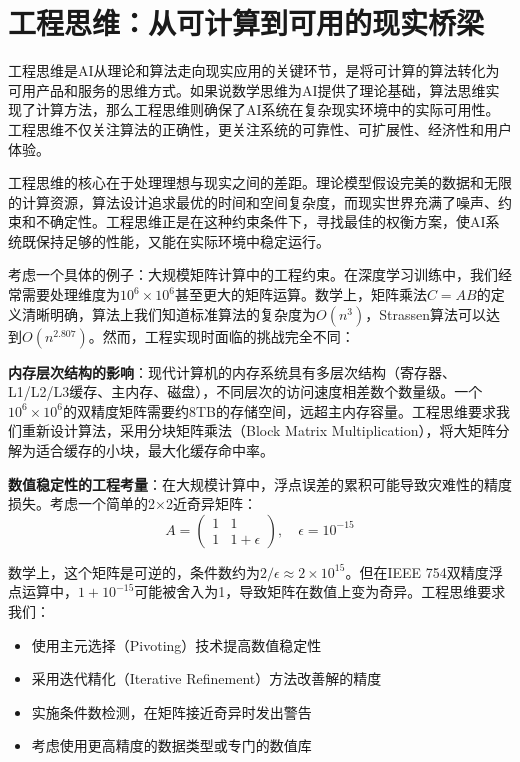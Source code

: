\section{工程思维：从可计算到可用的现实桥梁}

工程思维是AI从理论和算法走向现实应用的关键环节，是将可计算的算法转化为可用产品和服务的思维方式。如果说数学思维为AI提供了理论基础，算法思维实现了计算方法，那么工程思维则确保了AI系统在复杂现实环境中的实际可用性。工程思维不仅关注算法的正确性，更关注系统的可靠性、可扩展性、经济性和用户体验。

工程思维的核心在于处理理想与现实之间的差距。理论模型假设完美的数据和无限的计算资源，算法设计追求最优的时间和空间复杂度，而现实世界充满了噪声、约束和不确定性。工程思维正是在这种约束条件下，寻找最佳的权衡方案，使AI系统既保持足够的性能，又能在实际环境中稳定运行。

考虑一个具体的例子：大规模矩阵计算中的工程约束。在深度学习训练中，我们经常需要处理维度为$10^6 \times 10^6$甚至更大的矩阵运算。数学上，矩阵乘法$C = AB$的定义清晰明确，算法上我们知道标准算法的复杂度为$O(n^3)$，Strassen算法可以达到$O(n^{2.807})$。然而，工程实现时面临的挑战完全不同：

\textbf{内存层次结构的影响}：现代计算机的内存系统具有多层次结构（寄存器、L1/L2/L3缓存、主内存、磁盘），不同层次的访问速度相差数个数量级。一个$10^6 \times 10^6$的双精度矩阵需要约8TB的存储空间，远超主内存容量。工程思维要求我们重新设计算法，采用分块矩阵乘法（Block Matrix Multiplication），将大矩阵分解为适合缓存的小块，最大化缓存命中率。

\textbf{数值稳定性的工程考量}：在大规模计算中，浮点误差的累积可能导致灾难性的精度损失。考虑一个简单的2×2近奇异矩阵：
$$A = \begin{pmatrix} 1 & 1 \\ 1 & 1+\epsilon \end{pmatrix}, \quad \epsilon = 10^{-15}$$

数学上，这个矩阵是可逆的，条件数约为$2/\epsilon \approx 2 \times 10^{15}$。但在IEEE 754双精度浮点运算中，$1 + 10^{-15}$可能被舍入为1，导致矩阵在数值上变为奇异。工程思维要求我们：
\begin{itemize}
\item 使用主元选择（Pivoting）技术提高数值稳定性
\item 采用迭代精化（Iterative Refinement）方法改善解的精度
\item 实施条件数检测，在矩阵接近奇异时发出警告
\item 考虑使用更高精度的数据类型或专门的数值库
\end{itemize}

